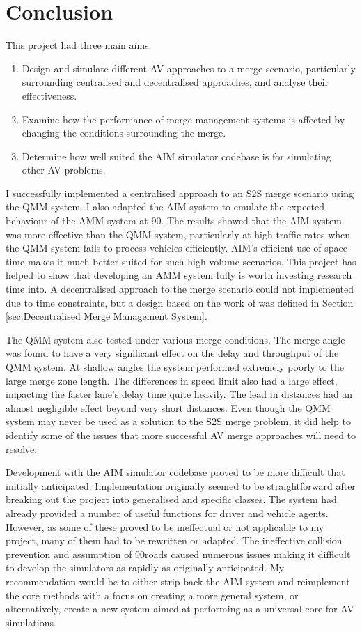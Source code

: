 \chapter{Conclusion}
\label{cha:Conclusion}
This project had three main aims.
\begin{enumerate}
\item Design and simulate different AV approaches to a merge scenario, particularly surrounding centralised and decentralised approaches, and analyse their effectiveness.
\item Examine how the performance of merge management systems is affected by changing the conditions surrounding the merge.
\item Determine how well suited the AIM simulator codebase is for simulating other AV problems.
\end{enumerate}

I successfully implemented a centralised approach to an S2S merge scenario using the QMM system. I also adapted the AIM system to emulate the expected behaviour of the AMM system at 90\degree. The results showed that the AIM system was more effective than the QMM system, particularly at high traffic rates when the QMM system fails to process vehicles efficiently. AIM's efficient use of space-time makes it much better suited for such high volume scenarios. This project has helped to show that developing an AMM system fully is worth investing research time into. A decentralised approach to the merge scenario could not implemented due to time constraints, but a design based on the work of \citep{VanMiddlesworth2008} was defined in Section \ref{sec:Decentralised Merge Management System}.

The QMM system also tested under various merge conditions. The merge angle was found to have a very significant effect on the delay and throughput of the QMM system. At shallow angles the system performed extremely poorly to the large merge zone length. The differences in speed limit also had a large effect, impacting the faster lane's delay time quite heavily. The lead in distances had an almost negligible effect beyond very short distances. Even though the QMM system may never be used as a solution to the S2S merge problem, it did help to identify some of the issues that more successful AV merge approaches will need to resolve.

Development with the AIM simulator codebase proved to be more difficult that initially anticipated. Implementation originally seemed to be straightforward after breaking out the project into generalised and specific classes. The system had already provided a number of useful functions for driver and vehicle agents. However, as some of these proved to be ineffectual or not applicable to my project, many of them had to be rewritten or adapted. The ineffective collision prevention and assumption of 90\degree roads caused numerous issues making it difficult to develop the simulators as rapidly as originally anticipated. My recommendation would be to either strip back the AIM system and reimplement the core methods with a focus on creating a more general system, or alternatively, create a new system aimed at performing as a universal core for AV simulations.

